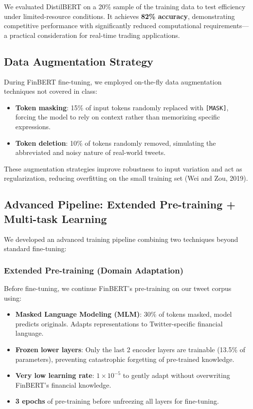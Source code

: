 \documentclass[11pt,a4paper]{article}
\begin{document}
We evaluated DistilBERT on a 20\% sample of the training data to test efficiency under limited-resource conditions. It achieves \textbf{82\% accuracy}, demonstrating competitive performance with significantly reduced computational requirements---a practical consideration for real-time trading applications.

\subsection{Data Augmentation Strategy}

During FinBERT fine-tuning, we employed on-the-fly data augmentation techniques not covered in class:
\begin{itemize}[noitemsep]
    \item \textbf{Token masking}: 15\% of input tokens randomly replaced with \texttt{[MASK]}, forcing the model to rely on context rather than memorizing specific expressions.
    \item \textbf{Token deletion}: 10\% of tokens randomly removed, simulating the abbreviated and noisy nature of real-world tweets.
\end{itemize}
These augmentation strategies improve robustness to input variation and act as regularization, reducing overfitting on the small training set (Wei and Zou, 2019).

\subsection{Advanced Pipeline: Extended Pre-training + Multi-task Learning}

We developed an advanced training pipeline combining two techniques beyond standard fine-tuning:

\subsubsection{Extended Pre-training (Domain Adaptation)}
Before fine-tuning, we continue FinBERT's pre-training on our tweet corpus using:
\begin{itemize}[noitemsep]
    \item \textbf{Masked Language Modeling (MLM)}: 30\% of tokens masked, model predicts originals. Adapts representations to Twitter-specific financial language.
    \item \textbf{Frozen lower layers}: Only the last 2 encoder layers are trainable (13.5\% of parameters), preventing catastrophic forgetting of pre-trained knowledge.
    \item \textbf{Very low learning rate}: $1 \times 10^{-5}$ to gently adapt without overwriting FinBERT's financial knowledge.
    \item \textbf{3 epochs} of pre-training before unfreezing all layers for fine-tuning.
\end{itemize}
\end{document}
